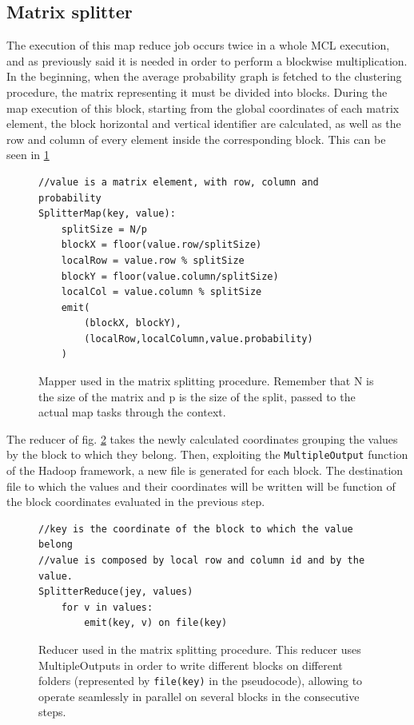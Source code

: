 \subsection{Matrix splitter}
\label{splitter}
The execution of this map reduce job occurs twice in a whole MCL execution, and as previously said it is needed in order to
perform a blockwise multiplication.
In the beginning, when the average probability graph is fetched to the clustering procedure, the matrix representing it must be
divided into blocks.
During the map execution of this block, starting from the global coordinates of each matrix element, the block horizontal
and vertical identifier are calculated, as well as the row and column of every element inside the corresponding block.
This can be seen in \ref{fig:splitterMap}

\begin{figure}[H]
\begin{verbatim}
//value is a matrix element, with row, column and probability
SplitterMap(key, value):
	splitSize = N/p
    blockX = floor(value.row/splitSize)
    localRow = value.row % splitSize
    blockY = floor(value.column/splitSize)
    localCol = value.column % splitSize
    emit(
        (blockX, blockY),
        (localRow,localColumn,value.probability)
    )
\end{verbatim}
\caption{Mapper used in the matrix splitting procedure. Remember that N is the size of the matrix and p is the size of the split, passed to the actual map tasks through the context.}
\label{fig:splitterMap}
\end{figure}
The reducer of fig. \ref{fig:splitterReduce} takes the newly calculated coordinates grouping the values by the block to which they belong.
Then, exploiting the \texttt{MultipleOutput} function of the Hadoop framework, a new file is generated for each block. The destination file
to which the values and their coordinates will be written will be function of the block coordinates evaluated in the previous step.

\begin{figure}[H]
\begin{verbatim}
//key is the coordinate of the block to which the value belong
//value is composed by local row and column id and by the value.
SplitterReduce(jey, values)
	for v in values:
		emit(key, v) on file(key)
\end{verbatim}
\caption{Reducer used in the matrix splitting procedure. This reducer uses MultipleOutputs in order to write different blocks on different folders (represented by \texttt{file(key)} in the pseudocode), allowing to operate seamlessly in parallel on several blocks in the consecutive steps.}
\label{fig:splitterReduce}
\end{figure}

